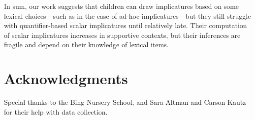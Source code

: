 \documentclass[10pt,letterpaper]{article}
\begin{document}
In sum, our work suggests that children can draw implicatures based on some lexical choices---such as in the case of ad-hoc implicatures---but they still struggle with quantifier-based scalar implicatures until relatively late. Their computation of scalar implicatures increases in supportive contexts, but their inferences are fragile and depend on their knowledge of lexical items.

\section{Acknowledgments}

Special thanks to the Bing Nursery School, and Sara Altman and Carson Kautz for their help with data collection. 



\setlength{\bibleftmargin}{.125in} \setlength{\bibindent}{-\bibleftmargin}


\end{document}
